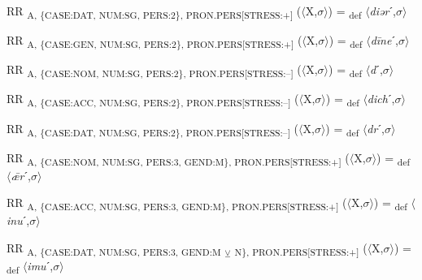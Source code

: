 {\begin{exe}
 RR \textsubscript{A, \{CASE:DAT, NUM:SG, PERS:2\}, PRON.PERS[STRESS:+]} ($\langle$X,$\sigma $$\rangle$) = \textsubscript{def} $\langle$\textit{diər}ˊ,$\sigma $$\rangle$
\end{exe}

\begin{exe}
 RR \textsubscript{A, \{CASE:GEN, NUM:SG, PERS:2\}, PRON.PERS[STRESS:+]} ($\langle$X,$\sigma $$\rangle$) = \textsubscript{def} $\langle$\textit{d\=ine}ˊ,$\sigma $$\rangle$
\end{exe}

\begin{exe}
 RR \textsubscript{A, \{CASE:NOM, NUM:SG, PERS:2\}, PRON.PERS[STRESS:–]} ($\langle$X,$\sigma $$\rangle$) = \textsubscript{def} $\langle$\textit{d}ˊ,$\sigma $$\rangle$
\end{exe}

\begin{exe}
 RR \textsubscript{A, \{CASE:ACC, NUM:SG, PERS:2\}, PRON.PERS[STRESS:–]} ($\langle$X,$\sigma $$\rangle$) = \textsubscript{def} $\langle$\textit{dich}ˊ,$\sigma $$\rangle$
\end{exe}

\begin{exe}
 RR \textsubscript{A, \{CASE:DAT, NUM:SG, PERS:2\}, PRON.PERS[STRESS:–]} ($\langle$X,$\sigma $$\rangle$) = \textsubscript{def} $\langle$\textit{dr}ˊ,$\sigma $$\rangle$
\end{exe}

\begin{exe}
 RR \textsubscript{A, \{CASE:NOM, NUM:SG, PERS:3, GEND:M\}, PRON.PERS[STRESS:+]} ($\langle$X,$\sigma $$\rangle$) = \textsubscript{def} $\langle$\textit{ǣr}ˊ,$\sigma $$\rangle$
\end{exe}

\begin{exe}
 RR \textsubscript{A, \{CASE:ACC, NUM:SG, PERS:3, GEND:M\}, PRON.PERS[STRESS:+]} ($\langle$X,$\sigma $$\rangle$) = \textsubscript{def} $\langle$\textit{inu}ˊ,$\sigma $$\rangle$
\end{exe}

\begin{exe}
 RR \textsubscript{A, \{CASE:DAT, NUM:SG, PERS:3, GEND:M} \textsubscript{${\veebar}$}\textsubscript{ N\}, PRON.PERS[STRESS:+]} ($\langle$X,$\sigma $$\rangle$) = \textsubscript{def} $\langle$\textit{imu}ˊ,$\sigma $$\rangle$
\end{exe}

}
